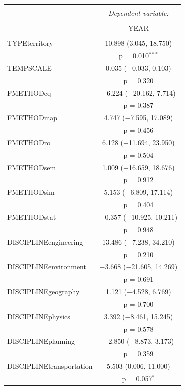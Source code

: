 \begin{table}[!htbp]
  \appcaption{}{}
\begin{tabular}{@{\extracolsep{5pt}}lc} 
\\[-1.8ex]\hline 
\hline \\[-1.8ex] 
 & \multicolumn{1}{c}{\textit{Dependent variable:}} \\ 
\cline{2-2} 
\\[-1.8ex] & YEAR \\ 
\hline \\[-1.8ex] 
 TYPEterritory & 10.898 (3.045, 18.750) \\ 
  & p = 0.010$^{***}$ \\ 
  TEMPSCALE & 0.035 ($-$0.033, 0.103) \\ 
  & p = 0.320 \\ 
  FMETHODeq & $-$6.224 ($-$20.162, 7.714) \\ 
  & p = 0.387 \\ 
  FMETHODmap & 4.747 ($-$7.595, 17.089) \\ 
  & p = 0.456 \\ 
  FMETHODro & 6.128 ($-$11.694, 23.950) \\ 
  & p = 0.504 \\ 
  FMETHODsem & 1.009 ($-$16.659, 18.676) \\ 
  & p = 0.912 \\ 
  FMETHODsim & 5.153 ($-$6.809, 17.114) \\ 
  & p = 0.404 \\ 
  FMETHODstat & $-$0.357 ($-$10.925, 10.211) \\ 
  & p = 0.948 \\ 
  DISCIPLINEengineering & 13.486 ($-$7.238, 34.210) \\ 
  & p = 0.210 \\ 
  DISCIPLINEenvironment & $-$3.668 ($-$21.605, 14.269) \\ 
  & p = 0.691 \\ 
  DISCIPLINEgeography & 1.121 ($-$4.528, 6.769) \\ 
  & p = 0.700 \\ 
  DISCIPLINEphysics & 3.392 ($-$8.461, 15.245) \\ 
  & p = 0.578 \\ 
  DISCIPLINEplanning & $-$2.850 ($-$8.873, 3.173) \\ 
  & p = 0.359 \\ 
  DISCIPLINEtransportation & 5.503 (0.006, 11.000) \\ 
  & p = 0.057$^{*}$ \\ 

\end{tabular}
\end{table}
